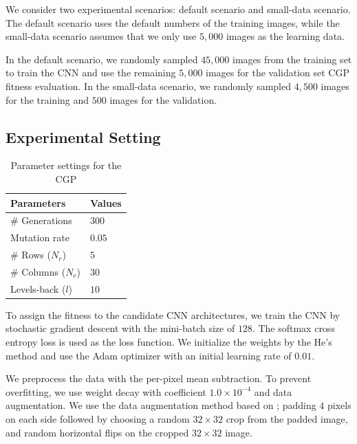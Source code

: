We consider two experimental scenarios: default scenario and small-data scenario.
The default scenario uses the default numbers of the training images, while the small-data scenario assumes that we only use $5,000$ images as the learning data. 

In the default scenario, we randomly sampled $45,000$ images from the training set to train the CNN and use the remaining $5,000$ images for the validation set  CGP fitness evaluation.
In the small-data scenario, we randomly sampled $4,500$ images for the training and $500$ images for the validation.

\subsection{Experimental Setting}

\begin{table}[t]
  \caption{Parameter settings for the CGP}
  \label{cgp_param}
  \begin{tabular}{l|l} \hline
    Parameters & Values \\ \hline
   \# Generations & $300$ \\ 
   Mutation rate & $0.05$ \\
   \#  Rows ($N_r$) & $5$ \\
   \#  Columns ($N_c$) & $30$ \\
   Levels-back ($l$) & $10$ \\ \hline
  \end{tabular}
\end{table}


To assign the fitness to the candidate CNN architectures, we train the CNN by stochastic gradient descent with the mini-batch size of $128$. The softmax cross entropy loss is used as the loss function.
We initialize the weights by the He's method \cite{he_delving_2015} and use the Adam optimizer \cite{kingma_adam:_2015} with an initial learning rate of $0.01$. 

We preprocess the data with the per-pixel mean subtraction.
To prevent overfitting, we use weight decay with  coefficient $1.0\times 10^{-4}$ and data augmentation.
We use the data augmentation method based on ; padding $4$ pixels on each side followed by choosing a random $32\times 32$ crop from the padded image, and random horizontal flips on the cropped $32 \times 32$ image.

